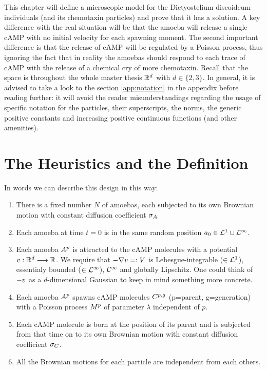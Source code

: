 \label{ch2}

This chapter will define a microscopic model for the Dictyostelium discoideum individuals (and its chemotaxin particles) and prove that it has a solution.
A key difference with the real situation will be that the amoeba will release a single cAMP with no initial velocity for each spawning moment.
The second important difference is that the release of cAMP will be regulated by a Poisson process, thus ignoring the fact that in reality the amoebas should respond to each trace of cAMP with the release of a chemical cry of more chemotaxin.
Recall that the space is throughout the whole master thesis $\mathbb{R}^d$ with $d\in\{2,3\}$.
In general, it is advised to take a look to the section \ref{app:notation} in the appendix before reading further: it will avoid the reader misunderstandings regarding the usage of specific notation for the particles, their superscripts, the norms, the generic positive constants and increasing positive continuous functions (and other amenities).

\section{The Heuristics and the Definition}

In words we can describe this design in this way:
\begin{enumerate}
\item There is a fixed number $N$ of amoebas, each subjected to its own Brownian motion with constant diffusion coefficient $\sigma_A$
\item Each amoeba at time $t=0$ is in the same random position $a_0 \in \mathcal{L}^1 \cup \mathcal{L}^\infty$.
\item Each amoeba $A^p$ is attracted to the cAMP molecules with a potential $v: \mathbb{R}^d \longrightarrow \mathbb{R}$.
We require that $-\nabla v =:V$ is Lebesgue-integrable (\ie $\in \mathcal{L}^1$), essentialy bounded (\ie $\in \mathcal{L}^\infty$), $\mathcal{C}^\infty$ and globally Lipschitz.
One could think of $-v$ as a $d$-dimensional Gaussian to keep in mind something more concrete.
\item Each amoeba $A^p$ spawns cAMP molecules $C^{p,g}$ (p=parent, g=generation) with a Poisson process $M^p$ of parameter $\lambda$ independent of $p$.
\item Each cAMP molecule is born at the position of its parent and is subjected from that time on to its own Brownian motion with constant diffusion coefficient $\sigma_C$.
\item All the Brownian motions for each particle are independent from each others.
\end{enumerate}

